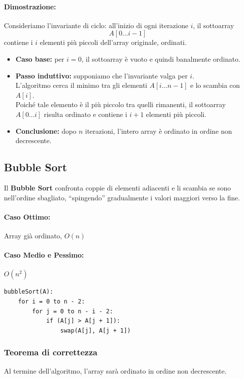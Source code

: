 \documentclass[a4paper,12pt]{article}
\begin{document}
\paragraph{Dimostrazione:}
Consideriamo l'invariante di ciclo: all'inizio di ogni iterazione $i$, il sottoarray
\[
A[0 \ldots i-1]
\]
contiene i $i$ elementi più piccoli dell'array originale, ordinati.
\begin{itemize}
    \item \textbf{Caso base:} per $i = 0$, il sottoarray è vuoto e quindi banalmente ordinato.

    \item \textbf{Passo induttivo:} supponiamo che l'invariante valga per $i$.\\
    L'algoritmo cerca il minimo tra gli elementi $A[i \ldots n-1]$ e lo scambia con $A[i]$.\\
    Poiché tale elemento è il più piccolo tra quelli rimanenti, il sottoarray $A[0 \ldots i]$ risulta ordinato e contiene i $i+1$ elementi più piccoli.

    \item \textbf{Conclusione:} dopo $n$ iterazioni, l'intero array è ordinato in ordine non decrescente.
\end{itemize}

\subsection{Bubble Sort}
Il \textbf{Bubble Sort} confronta coppie di elementi adiacenti e li scambia se sono nell’ordine sbagliato, “spingendo” gradualmente i valori maggiori verso la fine.

\paragraph{Caso Ottimo:} Array già ordinato, $O(n)$\\
\paragraph{Caso Medio e Pessimo:} $O(n^2)$

\begin{lstlisting}
bubbleSort(A):
    for i = 0 to n - 2:
        for j = 0 to n - i - 2:
            if (A[j] > A[j + 1]):
                swap(A[j], A[j + 1])
\end{lstlisting}
\subsubsection{Teorema di correttezza}
Al termine dell'algoritmo, l'array sarà ordinato in ordine non decrescente.
\end{document}
